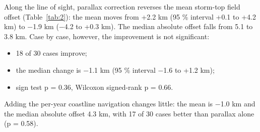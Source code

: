 Along the line of sight, parallax correction reverses the mean storm-top field offset (Table~\ref{tab:2}): the mean moves from +2.2 km (95 \% interval +0.1 to +4.2 km) to −1.9 km (−4.2 to +0.3 km). The median absolute offset falls from 5.1 to 3.8 km. Case by case, however, the improvement is not significant:

\begin{itemize}
\tightlist
\item
  18 of 30 cases improve;
\item
  the median change is −1.1 km (95 \% interval −1.6 to +1.2 km);
\item
  sign test p = 0.36, Wilcoxon signed-rank p = 0.66.
\end{itemize}

Adding the per-year coastline navigation changes little: the mean is −1.0 km and the median absolute offset 4.3 km, with 17 of 30 cases better than parallax alone (p = 0.58).

